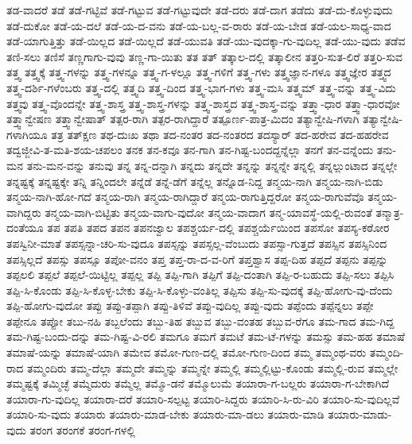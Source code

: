 {ತಡ-ವಾದರೆ
ತಡೆ
ತಡೆ-ಗಟ್ಟಿವೆ
ತಡೆ-ಗಟ್ಟುವ
ತಡೆ-ಗಟ್ಟುವುದೇ
ತಡೆ-ದರು
ತಡೆ-ದಾಗ
ತಡೆದು
ತಡೆ-ದು-ಕೊಳ್ಳುವುದು
ತಡೆ-ದುಕೋ
ತಡೆ-ಯ-ದಲೆ
ತಡೆ-ಯ-ದ-ವನು
ತಡೆ-ಯ-ಬಲ್ಲ-ವ-ರಾರು
ತಡೆ-ಯ-ಬೇಡ
ತಡೆ-ಯಲ-ಸಾಧ್ಯ-ವಾದ
ತಡೆ-ಯಾಗುತ್ತಿತ್ತು
ತಡೆ-ಯಿಲ್ಲದ
ತಡೆ-ಯಿಲ್ಲದೆ
ತಡೆ-ಯುವತಿ
ತಡೆ-ಯು-ವುದಕ್ಕಾ-ಗು-ವುದಿಲ್ಲ
ತಡೆ-ಯು-ವುದು
ತಡೆವ
ತಣಿ-ಸಲು
ತಣಿಸೆ
ತಣ್ಣಗಾಗು-ವುವು
ತಣ್ಣ-ಗಾ-ಯಿತು
ತತ
ತತ್
ತತ್ಕಾಲ-ದಲ್ಲಿ
ತತ್ಕಾಲೀನ
ತತ್ತರಿ-ಸುತ-ಲಿರೆ
ತತ್ತರಿ-ಸುವ
ತತ್ತ್ವ
ತತ್ತ್ವಕ್ಕೆ
ತತ್ತ್ವ-ಗಳನ್ನು
ತತ್ತ್ವ-ಗಳನ್ನೂ
ತತ್ತ್ವ-ಗ-ಳಲ್ಲೂ
ತತ್ತ್ವ-ಗಳಿಗೆ
ತತ್ತ್ವ-ಗಳು
ತತ್ತ್ವಜ್ಞಾನ-ಗಳೂ
ತತ್ತ್ವಜ್ಞೇರ
ತತ್ತ್ವದ
ತತ್ತ್ವ-ದರ್ಶಿ-ಗಳೆಂಬರು
ತತ್ತ್ವ-ದಲ್ಲಿ
ತತ್ತ್ವದಿ
ತತ್ತ್ವ-ದಿಂದ
ತತ್ತ್ವ-ಭಾಗ-ಗಳು
ತತ್ತ್ವ-ಮಸಿ
ತತ್ತ್ವಮ್
ತತ್ತ್ವ-ವನ್ನು
ತತ್ತ್ವ-ವಿದು
ತತ್ತ್ವವು
ತತ್ತ್ವ-ವೊಂದನ್ನೇ
ತತ್ತ್ವ-ಶಾಸ್ತ್ರ
ತತ್ತ್ವ-ಶಾಸ್ತ್ರ-ಗಳನ್ನು
ತತ್ತ್ವ-ಶಾಸ್ತ್ರದ
ತತ್ತ್ವ-ಶಾಸ್ತ್ರ-ವನ್ನು
ತತ್ತ್ವಾ-ಧಾರ
ತತ್ತ್ವಾ-ಧಾರವೋ
ತತ್ತ್ವಾನ್ವೇಷಣ
ತತ್ತ್ವಾನ್ವೇಷಾತ್
ತತ್ಪರ-ರಾಗಿ
ತತ್ಪರ-ರಾಗಿದ್ದಾರೆ
ತತ್ಪೂರ್ಣ-ಪಾತ್ರ-ಮಿದಂ
ತತ್ಯಾನ್ವೇಷಿ-ಗಳಾಗಿ
ತತ್ಯಾನ್ವೇಷಿ-ಗಳಾಗಿಯೂ
ತತ್ರ
ತತ್ಕ್ಷಣ
ತಥ-ದುಃಖ
ತಥಾ
ತದ-ನಂತರ
ತದ-ನಂತರದ
ತದಸ್ಯಾರ್
ತದ-ಹರೇವ
ತದ-ಹಹರೇವ
ತದ್ವಜ್ಜೀವಿ-ತ-ಮತಿ-ಶಯ-ಚಪಲಂ
ತನಕ
ತನ-ಕವೂ
ತನ-ಗಾಗಿ
ತನ-ಗಿಷ್ಟ-ಬಂದದ್ದನ್ನೆಲ್ಲಾ
ತನಗೆ
ತನ-ವನ್ನೆಂದು
ತನು-ಮನ
ತನು-ಮನ-ವನ್ನು
ತನುವು
ತನ್ನ
ತನ್ನ-ದನ್ನಾಗಿ
ತನ್ನದು
ತನ್ನದೇ
ತನ್ನನ್ನು
ತನ್ನನ್ನೇ
ತನ್ನಲ್ಲಿ
ತನ್ನಲ್ಲುಂಟಾದ
ತನ್ನಲ್ಲೇ
ತನ್ನಷ್ಟಕ್ಕೆ
ತನ್ನಷ್ಟಕ್ಕೇ
ತನ್ನಿ
ತನ್ನಿಂದಲೇ
ತನ್ನೆಡೆ
ತನ್ನೆ-ಡೆಗೆ
ತನ್ನೆಲ್ಲ
ತನ್ನೊಡ-ನಿದ್ದ
ತನ್ಮಯ-ನಾಗಿ
ತನ್ಮಯ-ನಾಗಿ-ಬಿಡು
ತನ್ಮಯ-ನಾಗಿ-ಹೋ-ಗದೆ
ತನ್ಮಯ-ರಾಗಿ
ತನ್ಮಯ-ರಾಗಿದ್ದಾರೆ
ತನ್ಮಯ-ರಾಗುತ್ತಿದ್ದರೋ
ತನ್ಮಯ-ರಾಗುವೆವೊ
ತನ್ಮಯ-ವಾಗಿದ್ದರು
ತನ್ಮಯ-ವಾಗಿ-ಬಿಟ್ಟಿತು
ತನ್ಮಯ-ವಾಗು-ವುದೋ
ತನ್ಮಯ-ವಾದಾಗ
ತನ್ಮ-ಯಾವಸ್ಥೆ-ಯಲ್ಲಿ-ರುವಂತೆ
ತನ್ಮಾತ್ರ-ದಂತೆಯೂ
ತಪ
ತಪತಿ
ತಪದ
ತಪನ
ತಪನಜ್ವಾಲ
ತಪಶ್ಚರ್ಯ-ದಲ್ಲಿ
ತಪಶ್ಚರ್ಯೆಯಿಂದ
ತಪಸೋ
ತಪಸ್ಯ-ಕಠೋರ
ತಪಸ್ವಿನೀ-ಮಾತೆ
ತಪಸ್ಸನ್ನಾ-ಚರಿ-ಸು-ವುದೂ
ತಪಸ್ಸನ್ನು
ತಪಸ್ಸಲ್ಲ-ವೆಂಬುದು
ತಪಸ್ಸಾ-ಗುತ್ತದೆ
ತಪಸ್ಸಿನ
ತಪಸ್ಸಿನಿಂದ
ತಪಸ್ಸಿಲ್ಲದೆ
ತಪಸ್ಸು
ತಪಸ್ಸೂ
ತಪೋ-ವನಂ
ತಪ್ತ
ತಪ್ತ-ರಾ-ದ-ವ-ರಿಗೆ
ತಪ್ತಶ್ವಾಸ
ತಪ್ಪ-ದಿಹ
ತಪ್ಪದೆ
ತಪ್ಪನು
ತಪ್ಪನ್ನು
ತಪ್ಪಲಲಿ
ತಪ್ಪಲೆ
ತಪ್ಪಲೆ-ಯಿಟ್ಟಿಲ್ಲ
ತಪ್ಪಲ್ಲ
ತಪ್ಪಿ
ತಪ್ಪಿ-ಗಾಗಿ
ತಪ್ಪಿಗೆ
ತಪ್ಪಿ-ದಂತಾಗಿ
ತಪ್ಪಿ-ರ-ಬಹುದು
ತಪ್ಪಿ-ಸಲು
ತಪ್ಪಿಸಿ
ತಪ್ಪಿ-ಸಿ-ಕೊಂಡು
ತಪ್ಪಿ-ಸಿ-ಕೊಳ್ಳ-ಬೇಕು
ತಪ್ಪಿ-ಸಿ-ಕೊಳ್ಳು-ವಂತಿಲ್ಲ
ತಪ್ಪಿಸು
ತಪ್ಪಿ-ಸು-ವುದಕ್ಕೆ
ತಪ್ಪಿ-ಹೋಗು-ವು-ದೆಂದು
ತಪ್ಪಿ-ಹೋಗು-ವುದೋ
ತಪ್ಪು
ತಪ್ಪು-ತಪ್ಪಾಗಿ
ತಪ್ಪು-ತಿಳಿವೆ
ತಪ್ಪು-ವುದಿಲ್ಲ
ತಪ್ಪು-ವುದು
ತಪ್ಪೆಂದು
ತಪ್ಪೆನ್ನಲು
ತಪ್ಪೇ
ತಪ್ಪೇನೂ
ತಪ್ಪೋ
ತಬು-ನಹಿ
ತಬ್ಬಲೆಂದು
ತಬ್ಬು-ತಿಹ
ತಬ್ಬುವ
ತಬ್ಬು-ವಂತಹ
ತಬ್ಬುವ-ರೆಗೂ
ತಮ-ಗಾದ
ತಮ-ಗಿದ್ದ
ತಮ-ಗಿಷ್ಟ-ಬಂದು-ದನ್ನು
ತಮ-ಗಿಷ್ಟ-ವಿ-ರಲಿ
ತಮಗೂ
ತಮಗೆ
ತಮಟೆ
ತಮ-ಟೆ-ಗಳನ್ನು
ತಮಸ್ಸು
ತಮ-ಹಹ
ತಮಾಷೆ
ತಮಾಷೆ-ಯನ್ನು
ತಮಾಷೆ-ಯಾಗಿ
ತಮೇವ
ತಮೋ-ಗುಣ-ದಲ್ಲಿ
ತಮೋ-ಗುಣ-ದಿಂದ
ತಮ್ಮ
ತಮ್ಮಂಥ-ವರು
ತಮ್ಮಂದಿ-ರಾದ
ತಮ್ಮಂದಿರು
ತಮ್ಮ-ದೆಲ್ಲಾ
ತಮ್ಮದೇ
ತಮ್ಮನ್ನು
ತಮ್ಮನ್ನೇ
ತಮ್ಮಲ್ಲಿ
ತಮ್ಮಲ್ಲಿಟ್ಟು-ಕೊಂಡು
ತಮ್ಮಲ್ಲಿ-ರುವ
ತಮ್ಮಲ್ಲೇ
ತಮ್ಮಷ್ಟಕ್ಕೆ
ತಮ್ಮಿಚ್ಛೆ
ತಮ್ಮೆದುರು
ತಮ್ಮೆಲ್ಲ
ತಮ್ಮೊ-ಡನೆ
ತಮ್ಮೊಲುಮೆ
ತಯಾರಾ-ಗ-ಬಲ್ಲರು
ತಯಾರಾ-ಗ-ಬೇಕಾಗಿದೆ
ತಯಾರಾ-ಗು-ವುದಿಲ್ಲ
ತಯಾರಾ-ದರೆ
ತಯಾರಿ-ಸಲ್ಪಟ್ಟ
ತಯಾರಿ-ಸಿದ್ದರು
ತಯಾರಿ-ಸಿ-ರು-ವಿರಿ
ತಯಾರಿ-ಸು-ವುದಿಲ್ಲವೆ
ತಯಾರಿ-ಸು-ವುದು
ತಯಾರು
ತಯಾರು-ಮಾಡ-ಬೇಕು
ತಯಾರು-ಮಾ-ಡಲು
ತಯಾರು-ಮಾಡಿ
ತಯಾರು-ಮಾಡು-ವುದು
ತರಂಗ
ತರಂಗಕೆ
ತರಂಗ-ಗಳಲ್ಲಿ
}
